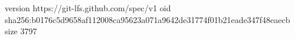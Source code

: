 version https://git-lfs.github.com/spec/v1
oid sha256:b0176c5d9658af112008ca95623a071a9642de31774f01b21eade347f48eaecb
size 3797

